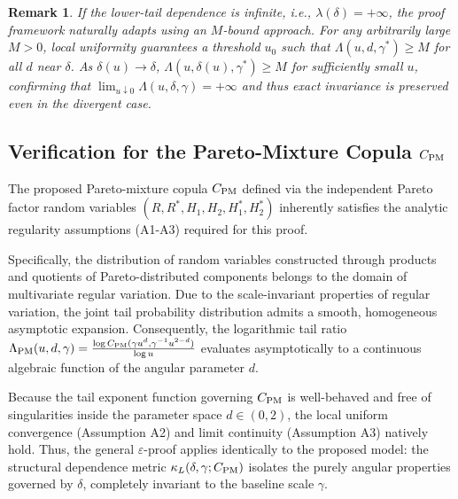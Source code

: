 \documentclass{article}
\newtheorem{remark}{Remark}
\begin{document}
\begin{remark}
If the lower-tail dependence is infinite, i.e., $\lambda(\delta) = +\infty$, the proof framework naturally adapts using an $M$-bound approach. For any arbitrarily large $M > 0$, local uniformity guarantees a threshold $u_0$ such that $\Lambda(u, d, \gamma^*) \ge M$ for all $d$ near $\delta$. As $\delta(u) \to \delta$, $\Lambda(u, \delta(u), \gamma^*) \ge M$ for sufficiently small $u$, confirming that $\lim_{u\downarrow 0} \Lambda(u, \delta, \gamma) = +\infty$ and thus exact invariance is preserved even in the divergent case.
\end{remark}

\subsection*{Verification for the Pareto-Mixture Copula $C_{\rm PM}$}

The proposed Pareto-mixture copula $C_{\rm PM}$ defined via the independent Pareto factor random variables $(R, R^*, H_1, H_2, H_1^*, H_2^*)$ inherently satisfies the analytic regularity assumptions (A1-A3) required for this proof. 

Specifically, the distribution of random variables constructed through products and quotients of Pareto-distributed components belongs to the domain of multivariate regular variation. Due to the scale-invariant properties of regular variation, the joint tail probability distribution admits a smooth, homogeneous asymptotic expansion. Consequently, the logarithmic tail ratio $\Lambda_{\rm PM}(u, d, \gamma) = \frac{\log C_{\rm PM}(\gamma u^d, \gamma^{-1}u^{2-d})}{\log u}$ evaluates asymptotically to a continuous algebraic function of the angular parameter $d$. 

Because the tail exponent function governing $C_{\rm PM}$ is well-behaved and free of singularities inside the parameter space $d \in (0,2)$, the local uniform convergence (Assumption A2) and limit continuity (Assumption A3) natively hold. Thus, the general $\varepsilon$-proof applies identically to the proposed model: the structural dependence metric $\kappa_L(\delta,\gamma;C_{\rm PM})$ isolates the purely angular properties governed by $\delta$, completely invariant to the baseline scale $\gamma$.
\end{document}

